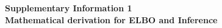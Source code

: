 
\newcommand{\lorem}{{\bf LOREM}}
\newcommand{\ipsum}{{\bf IPSUM}}

\newcommand{\ud}{\mathrm{d}} %
\newcommand{\R}{\mathbb{R}} %
\newcommand{\T}{\mathscr{T}}

\newcommand{\I}{\mathbb{I}} %

\newcommand{\CE}[2]{\mathrm{E}\left[\,#1\,|\,#2\,\right]} %

\newcommand{\by}{\boldsymbol{y}}
\newcommand{\bc}{\boldsymbol{c}}
\newcommand{\bd}{\boldsymbol{d}}
\newcommand{\bP}{\boldsymbol{\Phi}}
\newcommand{\bZ}{Z}%
\newcommand{\bV}{V}%
\newcommand{\br}{\boldsymbol{r}}
\newcommand{\bt}{\boldsymbol{t}}
\newcommand{\btheta}{\boldsymbol{\vartheta}}
\newcommand{\bht}{\hat{\boldsymbol{\vartheta}}}
\newcommand{\bz}{\boldsymbol{z}}
\newcommand{\bx}{{\boldsymbol{x}}}
\newcommand{\bv}{v}
\newcommand{\bw}{\boldsymbol{w}}
\newcommand{\vv}{\boldsymbol{v}}
\newcommand{\bepsilon}{\boldsymbol{\varepsilon}}


\begin{flushleft}
{\Large
\textbf{Supplementary Information 1 \\ Mathematical derivation for ELBO and Inference \\}
}
%
%
\end{flushleft}

